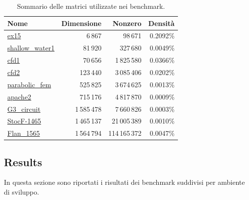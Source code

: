 \documentclass[a4paper, 12pt]{article}
\begin{document}
            \begin{table}[h]
                \centering
                
                \begin{tabular}{@{}lrrr@{}}
                \toprule
                \textbf{Nome}   
                & \textbf{Dimensione} & \textbf{Nonzero} & \textbf{Densità} \\ 
                \midrule
                \href{https://sparse.tamu.edu/FIDAP/ex15}{ex15}            
                & 6\,867         & 98\,671          & 0.2092\%         \\
                \href{https://sparse.tamu.edu/MaxPlanck/shallow_water1}{shallow\_water1} 
                & 81\,920        & 327\,680         & 0.0049\%         \\ 
                \href{https://sparse.tamu.edu/Rothberg/cfd1}{cfd1}            
                & 70\,656        & 1\,825\,580      & 0.0366\%         \\
                \href{https://sparse.tamu.edu/Rothberg/cfd2}{cfd2}            
                & 123\,440       & 3\,085\,406      & 0.0202\%         \\
                \href{https://sparse.tamu.edu/Wissgott/parabolic_fem}{parabolic\_fem}  
                & 525\,825       & 3\,674\,625      & 0.0013\%         \\
                \href{https://sparse.tamu.edu/GHS_psdef/apache2}{apache2}         
                & 715\,176       & 4\,817\,870      & 0.0009\%         \\
                \href{https://sparse.tamu.edu/AMD/G3_circuit}{G3\_circuit}     
                & 1\,585\,478    & 7\,660\,826      & 0.0003\%         \\
                \href{https://sparse.tamu.edu/Janna/StocF-1465}{StocF-1465}      
                & 1\,465\,137    & 21\,005\,389     & 0.0010\%         \\
                \href{https://sparse.tamu.edu/Janna/Flan_1565}{Flan\_1565}      
                & 1\,564\,794    & 114\,165\,372    & 0.0047\%         \\
                \bottomrule
                \end{tabular}%
                
                \caption{Sommario delle matrici utilizzate nei benchmark.}
                \label{tab:matrices}
                \end{table}
        
        \subsection{Results}
            In questa sezione sono riportati i risultati dei benchmark suddivisi per ambiente di sviluppo.
\end{document}

